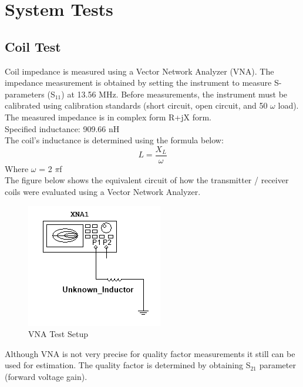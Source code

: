 \documentclass[12pt]{article}
\begin{document}
\section*{System Tests}
\subsection{Coil Test}
Coil impedance is measured using a Vector Network Analyzer (VNA). The impedance measurement is obtained by setting the instrument to measure S-parameters (S$_{11}$) at 13.56 MHz.  Before measurements, the instrument must be calibrated using calibration standards (short circuit, open circuit, and 50 $\omega$ load).  The measured impedance is in complex form R+jX form.\\

\noindent
Specified inductance: 909.66 nH\\

\noindent
The coil's inductance is determined using the formula below:
\begin{equation}
L = \frac{X_L}{\omega}
\end{equation}
\noindent
Where $\omega$ = 2 $\pi$f\\

\noindent
The figure below shows the equivalent circuit of how the transmitter / receiver coils were evaluated using a Vector Network Analyzer.
\hfill
\begin{figure}[h!]
\centering
\includegraphics[width=0.5\linewidth]{RX_SUBSYSTEM_COIL_TERMINALS.PNG}
\caption{VNA Test Setup}
\end{figure}

\pagebreak

\noindent
Although VNA is not very precise for quality factor measurements it still can be used for estimation. The quality factor is determined by obtaining S$_{21}$ parameter (forward voltage gain).\\
\end{document}

